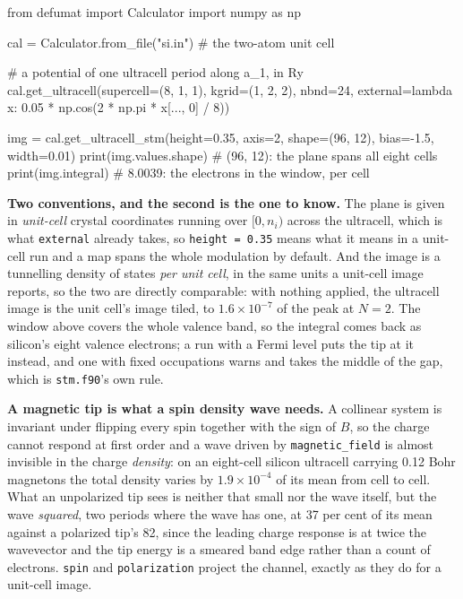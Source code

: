 \documentclass[11pt,a4paper]{article}
\newcommand{\code}[1]{\texttt{\small #1}}
\begin{document}
\begin{pycode}
from defumat import Calculator
import numpy as np

cal = Calculator.from_file("si.in")        # the two-atom unit cell

# a potential of one ultracell period along a_1, in Ry
cal.get_ultracell(supercell=(8, 1, 1), kgrid=(1, 2, 2), nbnd=24,
                  external=lambda x: 0.05 * np.cos(2 * np.pi * x[..., 0] / 8))

img = cal.get_ultracell_stm(height=0.35, axis=2, shape=(96, 12),
                            bias=-1.5, width=0.01)
print(img.values.shape)        # (96, 12): the plane spans all eight cells
print(img.integral)            # 8.0039: the electrons in the window, per cell
\end{pycode}

\textbf{Two conventions, and the second is the one to know.} The plane is given
in \emph{unit-cell} crystal coordinates running over $[0, n_i)$ across the
ultracell, which is what \code{external} already takes, so \code{height = 0.35}
means what it means in a unit-cell run and a map spans the whole modulation by
default. And the image is a tunnelling density of states \emph{per unit cell},
in the same units a unit-cell image reports, so the two are directly
comparable: with nothing applied, the ultracell image is the unit cell's image
tiled, to $1.6\times10^{-7}$ of the peak at $N = 2$. The window above covers the
whole valence band, so the integral comes back as silicon's eight valence
electrons; a run with a Fermi level puts the tip at it instead, and one with
fixed occupations warns and takes the middle of the gap, which is
\code{stm.f90}'s own rule.

\textbf{A magnetic tip is what a spin density wave needs.} A collinear system is
invariant under flipping every spin together with the sign of $B$, so the charge
cannot respond at first order and a wave driven by \code{magnetic\_field} is
almost invisible in the charge \emph{density}: on an eight-cell silicon
ultracell carrying 0.12 Bohr magnetons the total density varies by
$1.9\times10^{-4}$ of its mean from cell to cell. What an unpolarized tip sees
is neither that small nor the wave itself, but the wave \emph{squared}, two
periods where the wave has one, at 37 per cent of its mean against a polarized
tip's 82, since the leading charge response is at twice the wavevector and the
tip energy is a smeared band edge rather than a count of electrons.
\code{spin} and \code{polarization} project the channel, exactly as they do for
a unit-cell image.
\end{document}
